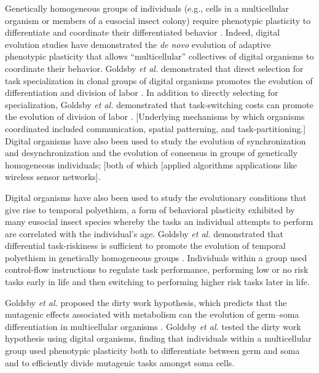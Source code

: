 Genetically homogeneous groups of individuals (e.g., cells in a multicellular organism or members of a eusocial insect colony) require phenotypic plasticity to differentiate and coordinate their differentiated behavior \citep{schlichting_origins_2003}. 
Indeed, digital evolution studies have demonstrated the \textit{de novo} evolution of adaptive phenotypic plasticity that allows  ``multicellular'' collectives of digital organisms to coordinate their behavior.
Goldsby \textit{et al.} demonstrated that direct selection for task specialization in clonal groups of digital organisms promotes the evolution of differentiation and division of labor \citep{goldsby_evolution_2010}.
In addition to directly selecting for specialization, Goldsby \textit{et al.} demonstrated that task-switching costs can promote the evolution of division of labor \citep{goldsby_evolution_2010,goldsby_task-switching_2012}.
[Underlying mechanisms by which organisms coordinated included communication, spatial patterning, and task-partitioning.]
Digital organisms have also been used to study the evolution of synchronization and desynchronization \citep{knoester_evolution_2011} and the evolution of consensus \citep{knoester_genetic_2013} in groups of genetically homogeneous individuals; [both of which [applied algorithms applications like wireless sensor networks]. 

Digital organisms have also been used to study the evolutionary conditions that give rise to temporal polyethism, a form of behavioral plasticity exhibited by many eusocial insect species whereby the tasks an individual attempts to perform are correlated with the individual's age.
Goldsby \textit{et al.} demonstrated that differential task-riskiness is sufficient to promote the evolution of temporal polyethism in genetically homogeneous groups \citep{goldsby_temporal_polyethism_2012}.
Individuals within a group used control-flow instructions to regulate task performance, performing low or no risk tasks early in life and then switching to performing higher risk tasks later in life. 

Goldsby \textit{et al.} proposed the dirty work hypothesis, which predicts that the mutagenic effects associated with metabolism can the evolution of germ--soma differentiation in multicellular organisms \citep{goldsby_evolutionary_2014}.
Goldsby \textit{et al.} tested the dirty work hypothesis using digital organisms, finding that individuals within a multicellular group used phenotypic plasticity both to differentiate between germ and soma and to efficiently divide mutagenic tasks amongst soma cells.

